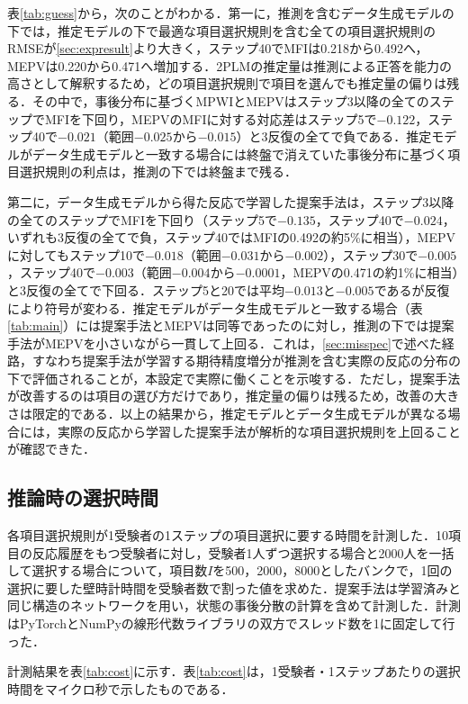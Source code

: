 \documentclass[paper]{ieicej}
\begin{document}
表\ref{tab:guess}から，次のことがわかる．第一に，推測を含むデータ生成モデルの下では，推定モデルの下で最適な項目選択規則を含む全ての項目選択規則のRMSEが\ref{sec:expresult}より大きく，ステップ40でMFIは0.218から0.492へ，MEPVは0.220から0.471へ増加する．2PLMの推定量は推測による正答を能力の高さとして解釈するため，どの項目選択規則で項目を選んでも推定量の偏りは残る．その中で，事後分布に基づくMPWIとMEPVはステップ3以降の全てのステップでMFIを下回り，MEPVのMFIに対する対応差はステップ5で$-0.122$，ステップ40で$-0.021$（範囲$-0.025$から$-0.015$）と3反復の全てで負である．推定モデルがデータ生成モデルと一致する場合には終盤で消えていた事後分布に基づく項目選択規則の利点は，推測の下では終盤まで残る．

第二に，データ生成モデルから得た反応で学習した提案手法は，ステップ3以降の全てのステップでMFIを下回り（ステップ5で$-0.135$，ステップ40で$-0.024$，いずれも3反復の全てで負，ステップ40ではMFIの0.492の約5\%に相当），MEPVに対してもステップ10で$-0.018$（範囲$-0.031$から$-0.002$），ステップ30で$-0.005$，ステップ40で$-0.003$（範囲$-0.004$から$-0.0001$，MEPVの0.471の約1\%に相当）と3反復の全てで下回る．ステップ5と20では平均$-0.013$と$-0.005$であるが反復により符号が変わる．推定モデルがデータ生成モデルと一致する場合（表\ref{tab:main}）には提案手法とMEPVは同等であったのに対し，推測の下では提案手法がMEPVを小さいながら一貫して上回る．これは，\ref{sec:misspec}で述べた経路，すなわち提案手法が学習する期待精度増分が推測を含む実際の反応の分布の下で評価されることが，本設定で実際に働くことを示唆する．ただし，提案手法が改善するのは項目の選び方だけであり，推定量の偏りは残るため，改善の大きさは限定的である．以上の結果から，推定モデルとデータ生成モデルが異なる場合には，実際の反応から学習した提案手法が解析的な項目選択規則を上回ることが確認できた．

\subsection{推論時の選択時間}\label{sec:costexp}

各項目選択規則が1受験者の1ステップの項目選択に要する時間を計測した．10項目の反応履歴をもつ受験者に対し，受験者1人ずつ選択する場合と2000人を一括して選択する場合について，項目数$I$を500，2000，8000としたバンクで，1回の選択に要した壁時計時間を受験者数で割った値を求めた．提案手法は学習済みと同じ構造のネットワークを用い，状態の事後分散の計算を含めて計測した．計測はPyTorchとNumPyの線形代数ライブラリの双方でスレッド数を1に固定して行った．

計測結果を表\ref{tab:cost}に示す．表\ref{tab:cost}は，1受験者・1ステップあたりの選択時間をマイクロ秒で示したものである．
\end{document}
